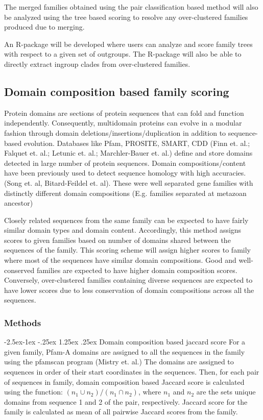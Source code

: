 \documentclass{article}
\makeatletter
\renewcommand\paragraph{\@startsection{paragraph}{4}{\z@}%
	{-2.5ex\@plus -1ex \@minus -.25ex}%
	{1.25ex \@plus .25ex}%
	{\normalfont\normalsize\bfseries}}
\makeatother
\begin{document}
		The merged families obtained using the pair classification based method will also be analyzed using the tree based scoring to resolve any over-clustered families produced due to merging.
		
		An R-package will be developed where users can analyze and score family trees with respect to a given set of outgroups. The R-package will also be able to directly extract ingroup clades from over-clustered families.
		\pagebreak
		
	\subsection{Domain composition based family scoring}
	Protein domains are sections of protein sequences that can fold and function independently. Consequently, multidomain proteins can evolve in a modular fashion through domain deletions/insertions/duplication in addition to sequence-based evolution. Databases like Pfam, PROSITE, SMART, CDD (Finn et. al.; Falquet et. al.; Letunic et. al.; Marchler-Bauer et. al.) define and store domains detected in large number of protein sequences. Domain compositions/content have been previously used to detect sequence homology with high accuracies. (Song et. al, Bitard-Feildel et. al). These were well separated gene families with distinctly different domain compositions (E.g. families separated at metazoan ancestor)
	
	Closely related sequences from the same family can be expected to have fairly similar domain types and domain content. Accordingly, this method assigns scores to given families based on number of domains shared between the sequences of the family. This scoring scheme will assign higher scores to family where most of the sequences have similar domain compositions. Good and well-conserved families are expected to have higher domain composition scores. Conversely, over-clustered families containing diverse sequences are expected to have lower scores due to less conservation of domain compositions across all the sequences.
	
	\subsubsection{Methods}
		\paragraph{Domain composition based jaccard score}
		For a given family, Pfam-A domains are assigned to all the sequences in the family using the pfamscan program (Mistry et. al.) The domains are assigned  to sequences in order of their start coordinates in the sequences. Then, for each pair of sequences in family, domain composition based Jaccard score is calculated using the function: $(n_1 \cup  n_2)/(n_1 \cap n_2)$, where $n_1$ and $n_2$ are the sets unique domains from sequence 1 and 2 of the pair, respectively. Jaccard score for the family is calculated as mean of all pairwise Jaccard scores from the family.
		
\end{document}
